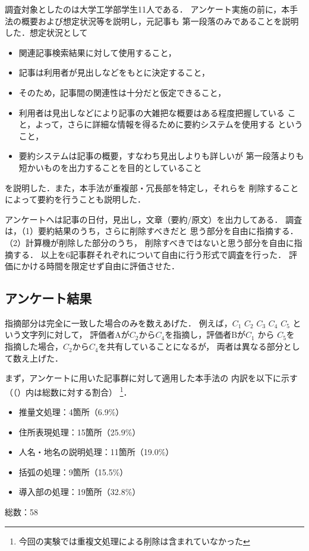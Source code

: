 調査対象としたのは大学工学部学生11人である．
アンケート実施の前に，本手法の概要および想定状況等を説明し，元記事も
第一段落のみであることを説明した．想定状況として
\begin{itemize}
 \item 関連記事検索結果に対して使用すること，
 \item 記事は利用者が見出しなどをもとに決定すること，
 \item そのため，記事間の関連性は十分だと仮定できること，
 \item 利用者は見出しなどにより記事の大雑把な概要はある程度把握している
       こと，よって，さらに詳細な情報を得るために要約システムを使用する
       ということ，
 \item 要約システムは記事の概要，すなわち見出しよりも詳しいが
       第一段落よりも短かいものを出力することを目的としていること
\end{itemize}
を説明した．また，本手法が重複部・冗長部を特定し，それらを
削除することによって要約を行うことも説明した．

アンケートへは記事の日付，見出し，文章（要約/原文）を出力してある．
調査は，（1）要約結果のうち，さらに削除すべきだと
思う部分を自由に指摘する．（2）計算機が削除した部分のうち，
削除すべきではないと思う部分を自由に指摘する．
以上を6記事群それぞれについて自由に行う形式で調査を行った．
評価にかける時間を限定せず自由に評価させた．

\subsection{アンケート結果}
\label{アンケート結果}
指摘部分は完全に一致した場合のみを数えあげた．
例えば，$C_1$ $C_2$ $C_3$  $C_4$ $C_5$ という文字列に対して，
評価者Aが$C_2$から$C_4$を指摘し，評価者Bが$C_1$ から $C_5$を
指摘した場合，$C_2からC_4$を共有していることになるが，
両者は異なる部分として数え上げた．

まず，アンケートに用いた記事群に対して適用した本手法の
内訳を以下に示す（（）内は総数に対する割合）
\footnote{今回の実験では重複文処理による削除は含まれていなかった}．
\begin{itemize}
 \item 推量文処理：4箇所（6.9\%）
 \item 住所表現処理：15箇所（25.9\%）
 \item 人名・地名の説明処理：11箇所（19.0\%）
 \item 括弧の処理：9箇所（15.5\%）
 \item 導入部の処理：19箇所（32.8\%）
\end{itemize}
総数：58

